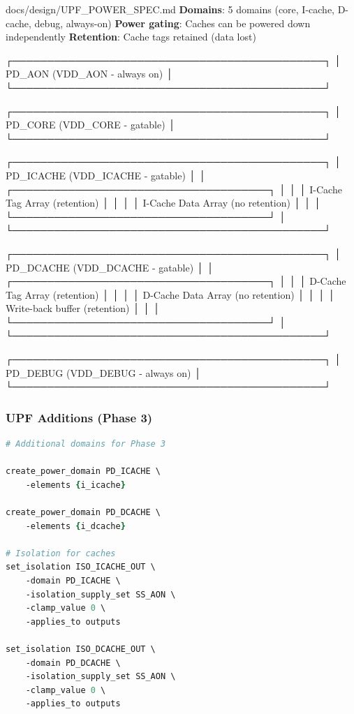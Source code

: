 \begin{relocated}{docs/design/UPF_POWER_SPEC.md}
\textbf{Domains}: 5 domains (core, I-cache, D-cache, debug, always-on)
\textbf{Power gating}: Caches can be powered down independently
\textbf{Retention}: Cache tags retained (data lost)

\begin{textblock}
┌─────────────────────────────────────────────┐
│         PD_AON (VDD_AON - always on)        │
└─────────────────────────────────────────────┘

┌─────────────────────────────────────────────┐
│         PD_CORE (VDD_CORE - gatable)        │
└─────────────────────────────────────────────┘

┌─────────────────────────────────────────────┐
│       PD_ICACHE (VDD_ICACHE - gatable)      │
│  ┌─────────────────────────────────────┐   │
│  │  I-Cache Tag Array (retention)      │   │
│  │  I-Cache Data Array (no retention)  │   │
│  └─────────────────────────────────────┘   │
└─────────────────────────────────────────────┘

┌─────────────────────────────────────────────┐
│       PD_DCACHE (VDD_DCACHE - gatable)      │
│  ┌─────────────────────────────────────┐   │
│  │  D-Cache Tag Array (retention)      │   │
│  │  D-Cache Data Array (no retention)  │   │
│  │  Write-back buffer (retention)      │   │
│  └─────────────────────────────────────┘   │
└─────────────────────────────────────────────┘

┌─────────────────────────────────────────────┐
│         PD_DEBUG (VDD_DEBUG - always on)    │
└─────────────────────────────────────────────┘
\end{textblock}

\subsubsection{UPF Additions (Phase 3)}\label{ds:ch:upf-power-spec:upf-additions-phase-3}

\begin{lstlisting}[language=tcl]
# Additional domains for Phase 3

create_power_domain PD_ICACHE \
    -elements {i_icache}

create_power_domain PD_DCACHE \
    -elements {i_dcache}

# Isolation for caches
set_isolation ISO_ICACHE_OUT \
    -domain PD_ICACHE \
    -isolation_supply_set SS_AON \
    -clamp_value 0 \
    -applies_to outputs

set_isolation ISO_DCACHE_OUT \
    -domain PD_DCACHE \
    -isolation_supply_set SS_AON \
    -clamp_value 0 \
    -applies_to outputs


\end{lstlisting}
\end{relocated}
